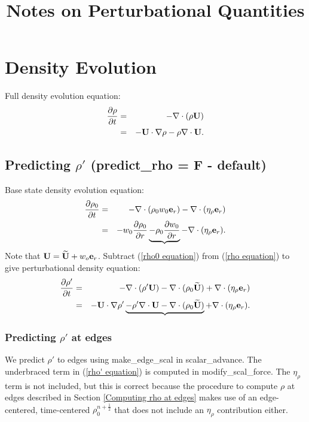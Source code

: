 \documentclass[11pt]{article}
\title{Notes on Perturbational Quantities}
\def\half  {\frac{1}{2}}
\def\eb    {{\bf e}}
\def\Ub    {{\bf U}}
\def\Ubt   {\widetilde{\bf U}}
\begin{document}
\maketitle
\tableofcontents
\cleardoublepage

\section{Density Evolution}
Full density evolution equation:
\begin{eqnarray}
\frac{\partial\rho}{\partial t} &=& -\nabla\cdot(\rho\Ub) \nonumber \\
&=& -\Ub\cdot\nabla\rho -\rho\nabla\cdot\Ub. \label{rho equation}
\end{eqnarray}
\subsection{Predicting $\rho'$ (predict\_rho = F - default)}
Base state density evolution equation:
\begin{eqnarray}
\frac{\partial\rho_0}{\partial t} &=& -\nabla\cdot(\rho_0 w_0 \eb_r) - 
\nabla\cdot(\eta_\rho \eb_r) \nonumber \\
&=& -w_0\frac{\partial\rho_0}{\partial r} \underbrace{- 
\rho_0\frac{\partial w_0}{\partial r}} 
- \nabla\cdot(\eta_\rho \eb_r). \label{rho0 equation}
\end{eqnarray}
Note that $\Ub = \Ubt + w_o\eb_r$.  Subtract (\ref{rho0 equation}) from 
(\ref{rho equation}) to give perturbational density equation:
\begin{eqnarray}
\frac{\partial\rho'}{\partial t} &=& -\nabla\cdot(\rho'\Ub) - \nabla\cdot(\rho_0\Ubt) 
+ \nabla\cdot(\eta_\rho \eb_r) \nonumber \\
&=& -\Ub\cdot\nabla\rho' \underbrace{- \rho'\nabla\cdot\Ub - \nabla\cdot(\rho_0\Ubt)} 
+ \nabla\cdot(\eta_\rho \eb_r).\label{rho' equation}
\end{eqnarray}
\subsubsection{Predicting $\rho'$ at edges}
We predict $\rho'$ to edges using make\_edge\_scal in scalar\_advance.  The underbraced 
term in (\ref{rho' equation}) is computed in modify\_scal\_force.  The $\eta_\rho$ term 
is not included, but this is correct because the procedure to compute $\rho$ at edges 
described in Section \ref{Computing rho at edges} makes use of an edge-centered, 
time-centered $\rho_0^{n+\half}$ that does not include an $\eta_\rho$ contribution either.
\end{document}
